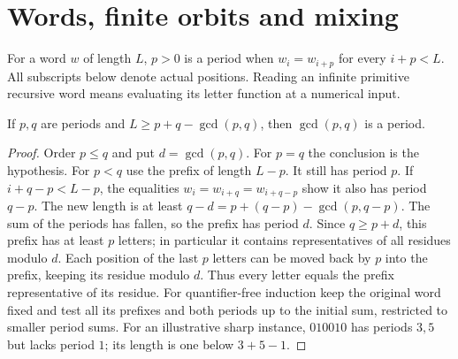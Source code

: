 \section{Words, finite orbits and mixing}
\label{sec:words}
For a word $w$ of length $L$, $p>0$ is a period when $w_i=w_{i+p}$ for every $i+p<L$. All subscripts below denote actual positions. Reading an infinite primitive recursive word means evaluating its letter function at a numerical input.

\begin{theorem}\label{result67}
If $p,q$ are periods and $L\ge p+q-\gcd(p,q)$, then $\gcd(p,q)$ is a period.
\end{theorem}
\begin{proof}
Order $p\le q$ and put $d=\gcd(p,q)$. For $p=q$ the conclusion is the hypothesis. For $p<q$ use the prefix of length $L-p$. It still has period $p$. If $i+q-p<L-p$, the equalities $w_i=w_{i+q}=w_{i+q-p}$ show it also has period $q-p$. The new length is at least $q-d=p+(q-p)-\gcd(p,q-p)$. The sum of the periods has fallen, so the prefix has period $d$. Since $q\ge p+d$, this prefix has at least $p$ letters; in particular it contains representatives of all residues modulo $d$. Each position of the last $p$ letters can be moved back by $p$ into the prefix, keeping its residue modulo $d$. Thus every letter equals the prefix representative of its residue. For quantifier-free induction keep the original word fixed and test all its prefixes and both periods up to the initial sum, restricted to smaller period sums. For an illustrative sharp instance, $010010$ has periods $3,5$ but lacks period $1$; its length is one below $3+5-1$.
\end{proof}


